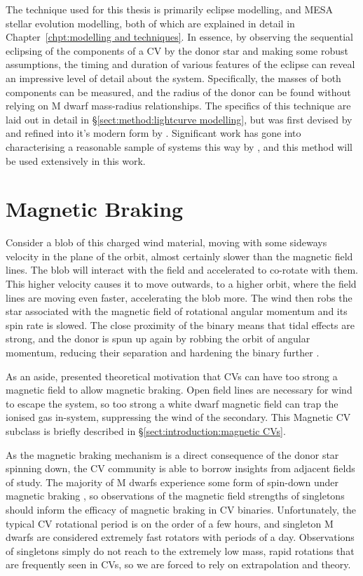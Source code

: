 The technique used for this thesis is primarily eclipse modelling, and MESA stellar evolution modelling, both of which are explained in detail in Chapter~\ref{chpt:modelling and techniques}. In essence, by observing the sequential eclipsing of the components of a CV by the donor star and making some robust assumptions, the timing and duration of various features of the eclipse can reveal an impressive level of detail about the system. Specifically, the masses of both components can be measured, and the radius of the donor can be found without relying on M dwarf mass-radius relationships. The specifics of this technique are laid out in detail in \S\ref{sect:method:lightcurve modelling}, but was first devised by \citet{wood1986} and refined into it's modern form by \citet{Savoury2011}. Significant work has gone into characterising a reasonable sample of systems this way by \citet{McAllister2019}, and this method will be used extensively in this work.


\section{Magnetic Braking}
\label{sect:introduction:magnetic braking}

Consider a blob of this charged wind material, moving with some sideways velocity in the plane of the orbit, almost certainly slower than the magnetic field lines. 
The blob will interact with the field and accelerated to co-rotate with them.
This higher velocity causes it to move outwards, to a higher orbit, where the field lines are moving even faster, accelerating the blob more. 
The wind then robs the star associated with the magnetic field of rotational angular momentum and its spin rate is slowed. The close proximity of the binary means that tidal effects are strong, and the donor is spun up again by robbing the orbit of angular momentum, reducing their separation and hardening the binary further \citep{verbunt1981}.

As an aside, \citet{wickramasinghe1996} presented theoretical motivation that CVs can have too strong a magnetic field to allow magnetic braking. Open field lines are necessary for wind to escape the system, so too strong a white dwarf magnetic field can trap the ionised gas in-system, suppressing the wind of the secondary. This Magnetic CV subclass is briefly described in \S\ref{sect:introduction:magnetic CVs}.

As the magnetic braking mechanism is a direct consequence of the donor star spinning down, the CV community is able to borrow insights from adjacent fields of study. The majority of M dwarfs experience some form of spin-down under magnetic braking , so observations of the magnetic field strengths of singletons should inform the efficacy of magnetic braking in CV binaries. Unfortunately, the typical CV rotational period is on the order of a few hours, and singleton M dwarfs are considered extremely fast rotators with periods of a day. Observations of singletons simply do not reach to the extremely low mass, rapid rotations that are frequently seen in CVs, so we are forced to rely on extrapolation and theory.

